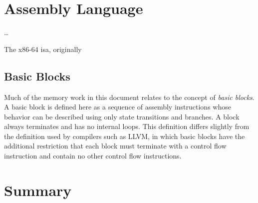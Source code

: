 %
%

\section{Assembly Language}
\todo\dots

The x86-64
\ac{isa}, originally

\subsection{Basic Blocks}
Much of the memory work in this document relates to the concept of \emph{basic blocks}.%
A basic block is defined here as a sequence of assembly instructions
whose behavior can be described using only state transitions and branches.
A block always terminates and has no internal loops.
This definition differs slightly from the definition used by compilers such as LLVM,
in which basic blocks have the additional restriction that
each block must terminate with a control flow instruction and contain no other
control flow instructions.

\section{Summary}
